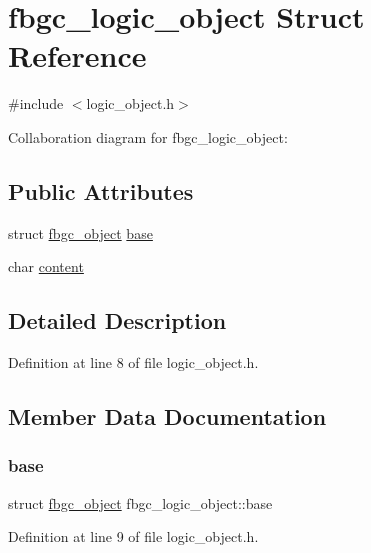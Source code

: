 \hypertarget{structfbgc__logic__object}{}\section{fbgc\+\_\+logic\+\_\+object Struct Reference}
\label{structfbgc__logic__object}


{\ttfamily \#include $<$logic\+\_\+object.\+h$>$}



Collaboration diagram for fbgc\+\_\+logic\+\_\+object\+:
\subsection*{Public Attributes}
\begin{DoxyCompactItemize}
\item 
struct \hyperlink{structfbgc__object}{fbgc\+\_\+object} \hyperlink{structfbgc__logic__object_acbc193ce811e492305ed4a1adc0a77db}{base}
\item 
char \hyperlink{structfbgc__logic__object_a7f4ab31cade57f8812f09497d03854ae}{content}
\end{DoxyCompactItemize}


\subsection{Detailed Description}


Definition at line 8 of file logic\+\_\+object.\+h.



\subsection{Member Data Documentation}
\mbox{\label{structfbgc__logic__object_acbc193ce811e492305ed4a1adc0a77db}} 
\subsubsection{\texorpdfstring{base}{base}}
{\footnotesize\ttfamily struct \hyperlink{structfbgc__object}{fbgc\+\_\+object} fbgc\+\_\+logic\+\_\+object\+::base}



Definition at line 9 of file logic\+\_\+object.\+h.

